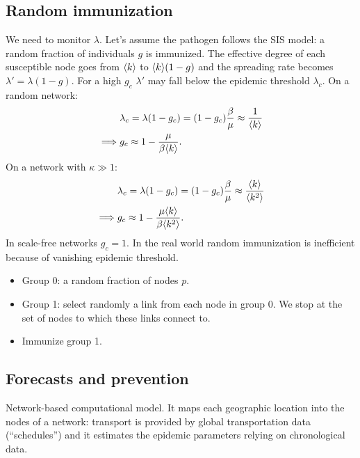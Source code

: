 \documentclass[a4paper,9pt]{extarticle}
\begin{document}
\begin{multicols*}{2}
	\subsection{Random immunization}
	We need to monitor $\lambda$. Let's assume the pathogen follows the SIS model: a random fraction of individuals $g$ is immunized. The effective degree of each susceptible node goes from $\langle k \rangle$ to $\langle k \rangle(1-g)$ and the spreading rate becomes $\lambda'=\lambda(1-g)$. For a high $g_{c}$ $\lambda'$ may fall below the epidemic threshold $\lambda_{c}$. On a random network:
	\begin{align*}
	&	\lambda_{c}=\lambda(1-g_{c})=(1-g_{c})\frac{\beta}{\mu}\approx\frac{1}{\langle k \rangle}\\
	\implies&g_{c}\approx1-\frac{\mu}{\beta\langle k \rangle}.
	\end{align*}
	On a network with $\kappa\gg1$:
	\begin{align*}
		&	\lambda_{c}=\lambda(1-g_{c})=(1-g_{c})\frac{\beta}{\mu}\approx\frac{\langle k \rangle}{\langle k^{2} \rangle}\\
		\implies&g_{c}\approx1-\frac{\mu\langle k \rangle}{\beta\langle k^{2} \rangle}.
	\end{align*}
	In scale-free networks $g_{c}=1$. In the real world random immunization is inefficient because of vanishing epidemic threshold.
	\begin{riquadro}
		\begin{itemize}
			\item Group 0: a random fraction of nodes $p$.
			\item Group 1: select randomly a link from each node in group 0. We stop at the set of nodes to which these links connect to.
			\item Immunize group 1.
		\end{itemize}
	\end{riquadro}
	\subsection{Forecasts and prevention}
	\begin{riquadro}[GLEAM]
		Network-based computational model. It maps each geographic location into the nodes of a network: transport is provided by global transportation data (``schedules'') and it estimates the epidemic parameters relying on chronological data.
	\end{riquadro}
	\end{multicols*}
\end{document}
